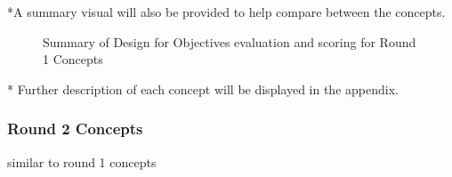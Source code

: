 *A summary visual will also be provided to help compare between the concepts.
\begin{figure}[H]
    \centering
    \caption{Summary of Design for Objectives evaluation and scoring for Round 1 Concepts}
    \label{fig:summary}
\end{figure}


* Further description of each concept will be displayed in the appendix. 


\subsubsection{Round 2 Concepts}
similar to round 1 concepts


